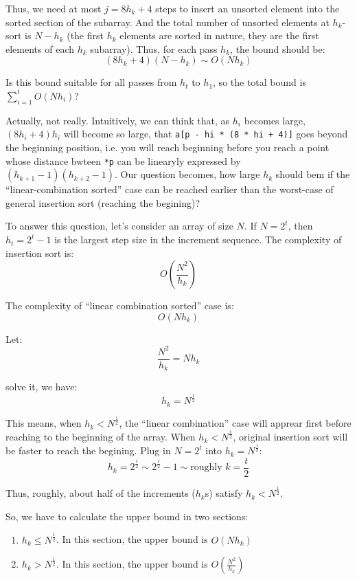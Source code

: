 \documentclass[11pt]{book}
\begin{document}
Thus, we need at most \(j = 8h_k + 4\) steps to insert an unsorted element into the sorted section of the subarray. And the total number of unsorted elements at \(h_k\)-sort is \(N - h_k\) (the first \(h_k\) elements are sorted in nature, they are the first elements of each \(h_k\) subarray). Thus, for each pass \(h_k\), the bound should be:
\[
(8h_k + 4)(N - h_k) \sim O(Nh_k)
\]

Is this bound suitable for all passes from \(h_t\) to \(h_1\), so the total bound is \(\sum_{i = 1}^{t}O(Nh_i)\)?

Actually, not really. Intuitively, we can think that, as \(h_i\) becomes large, \((8h_i + 4)h_i\) will become so large, that \texttt{a[p - hi * (8 * hi + 4)]} goes beyond the beginning position, i.e. you will reach beginning before you reach a point whose distance bwteen \texttt{*p} can be linearyly expressed by \((h_{k + 1} - 1)(h_{k + 2} - 1)\). Our question becomes, how large \(h_k\) should bem if the ``linear-combination sorted'' case can be reached earlier than the worst-case of general insertion sort (reaching the begining)?

To answer this question, let's consider an array of size \(N\). If \(N = 2^t\), then \(h_t = 2^t - 1\) is the largest step size in the increment sequence. The complexity of insertion sort is:
\[
O(\frac {N^2} {h_k})
\]

The complexity of ``linear combination sorted'' case is:
\[
O(Nh_k)
\]

Let:
\[
\frac {N^2} {h_k} = Nh_k
\]

solve it, we have:
\[
h_k = N^{\frac {1} {2}}
\]

This means, when \(h_k < N^{\frac {1} {2}}\), the ``linear combination'' case will apprear first before reaching to the beginning of the array. When \(h_k < N^{\frac {1} {2}}\), original insertion sort will be faster to reach the begining. Plug in \(N = 2^t\) into \(h_k = N^{\frac {1} {2}}\):
\[
h_k = 2^{\frac {t} {2}} \sim 2^{\frac {t} {2}} - 1 \sim \text {roughly } k = \frac {t} {2}
\]

Thus, roughly, about half of the increments (\(h_k\)s) satisfy \(h_k < N^{\frac {1} {2}}\).

So, we have to calculate the upper bound in two sections:
\begin{enumerate}
\item \(h_k \leq N^{\frac {1} {2}}\). In this section, the upper bound is \(O(Nh_k)\)
\item \(h_k > N^{\frac {1} {2}}\). In this section, the upper bound is \(O(\frac {N^2} {h_k})\)
\end{enumerate}
\end{document}
